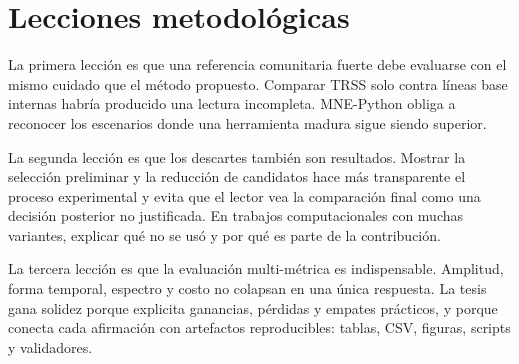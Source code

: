 \section{Lecciones metodológicas}

La primera lección es que una referencia comunitaria fuerte debe evaluarse con el mismo cuidado que el método propuesto. Comparar TRSS solo contra líneas base internas habría producido una lectura incompleta. MNE-Python obliga a reconocer los escenarios donde una herramienta madura sigue siendo superior.

La segunda lección es que los descartes también son resultados. Mostrar la selección preliminar y la reducción de candidatos hace más transparente el proceso experimental y evita que el lector vea la comparación final como una decisión posterior no justificada. En trabajos computacionales con muchas variantes, explicar qué no se usó y por qué es parte de la contribución.

La tercera lección es que la evaluación multi-métrica es indispensable. Amplitud, forma temporal, espectro y costo no colapsan en una única respuesta. La tesis gana solidez porque explicita ganancias, pérdidas y empates prácticos, y porque conecta cada afirmación con artefactos reproducibles: tablas, CSV, figuras, scripts y validadores.
